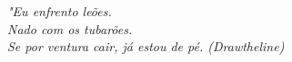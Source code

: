 \begin{epigrafe}
    \vspace*{\fill}
	\begin{flushright}
		\textit{"Eu enfrento leões.\\ Nado com os tubarões.\\ Se por ventura cair, já estou de pé.
		(Drawtheline)}
	\end{flushright}
\end{epigrafe}

